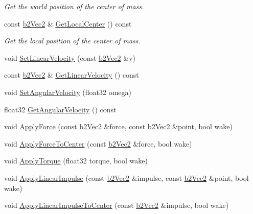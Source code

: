 \begin{DoxyCompactItemize}
\begin{DoxyCompactList}\small\item\em Get the world position of the center of mass. \end{DoxyCompactList}\item 
\mbox{\label{classb2Body_a60cc46fc46849b0d5e61a151b7c41269}} 
const \mbox{\hyperlink{structb2Vec2}{b2\+Vec2}} \& \mbox{\hyperlink{classb2Body_a60cc46fc46849b0d5e61a151b7c41269}{Get\+Local\+Center}} () const
\begin{DoxyCompactList}\small\item\em Get the local position of the center of mass. \end{DoxyCompactList}\item 
void \mbox{\hyperlink{classb2Body_a832f3989a44f0d4782c80456832197ad}{Set\+Linear\+Velocity}} (const \mbox{\hyperlink{structb2Vec2}{b2\+Vec2}} \&v)
\item 
const \mbox{\hyperlink{structb2Vec2}{b2\+Vec2}} \& \mbox{\hyperlink{classb2Body_a8fcaf842141320701057f679dff90b89}{Get\+Linear\+Velocity}} () const
\item 
void \mbox{\hyperlink{classb2Body_a37adc4160b84f73e8552a91cbde3f578}{Set\+Angular\+Velocity}} (float32 omega)
\item 
float32 \mbox{\hyperlink{classb2Body_a6a404d85efc510f43575f61cb95c07a7}{Get\+Angular\+Velocity}} () const
\item 
void \mbox{\hyperlink{classb2Body_a942be8e1cd2bcd06f53c4638c45a9525}{Apply\+Force}} (const \mbox{\hyperlink{structb2Vec2}{b2\+Vec2}} \&force, const \mbox{\hyperlink{structb2Vec2}{b2\+Vec2}} \&point, bool wake)
\item 
void \mbox{\hyperlink{classb2Body_abeba04911f7a2a141169bb06fe98d06a}{Apply\+Force\+To\+Center}} (const \mbox{\hyperlink{structb2Vec2}{b2\+Vec2}} \&force, bool wake)
\item 
void \mbox{\hyperlink{classb2Body_a54a354447ac3b4cc224c8327a5abc0e8}{Apply\+Torque}} (float32 torque, bool wake)
\item 
void \mbox{\hyperlink{classb2Body_a7f677e93efb3c4c065087aff317274a3}{Apply\+Linear\+Impulse}} (const \mbox{\hyperlink{structb2Vec2}{b2\+Vec2}} \&impulse, const \mbox{\hyperlink{structb2Vec2}{b2\+Vec2}} \&point, bool wake)
\item 
void \mbox{\hyperlink{classb2Body_afa249d2fc11735985211e47c3d8e16fb}{Apply\+Linear\+Impulse\+To\+Center}} (const \mbox{\hyperlink{structb2Vec2}{b2\+Vec2}} \&impulse, bool wake)
\item 

\end{DoxyCompactItemize}
